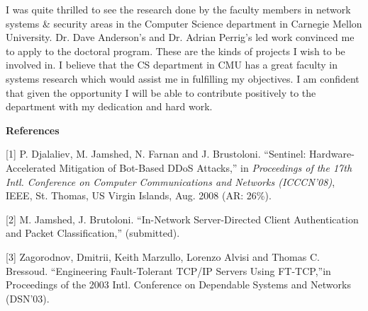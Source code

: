 I was quite thrilled to see the research done by the faculty members in network 
systems \& security areas in the Computer Science department in Carnegie Mellon 
University. Dr. Dave Anderson's and Dr. Adrian Perrig's led work convinced me to 
apply to the doctoral program. These are the kinds of projects I wish to be 
involved in. I believe that the CS department in CMU has a great faculty in 
systems research which would assist me in fulfilling my objectives. I am 
confident that given the opportunity I will be able to contribute positively 
to the department with my dedication and hard work.
\vs
\vs

{\Large \bf References}
\vs

[1] P. Djalaliev, M. Jamshed, N. Farnan and J. Brustoloni. ``Sentinel:
Hardware-Accelerated Mitigation of Bot-Based DDoS Attacks,'' in
\textit{Proceedings of the 17th Intl. Conference on Computer Communications
and Networks (ICCCN'08)}, IEEE, St. Thomas, US Virgin Islands,
Aug. 2008 (AR: 26\%).
\vs

[2] M. Jamshed, J. Brutoloni. ``In-Network Server-Directed Client
Authentication and Packet Classification,'' (submitted).
\vs

[3] Zagorodnov, Dmitrii, Keith Marzullo, Lorenzo Alvisi and Thomas
C. Bressoud. ``Engineering Fault-Tolerant TCP/IP Servers Using
FT-TCP,''in Proceedings of the 2003 Intl. Conference on Dependable
Systems and Networks (DSN'03).

